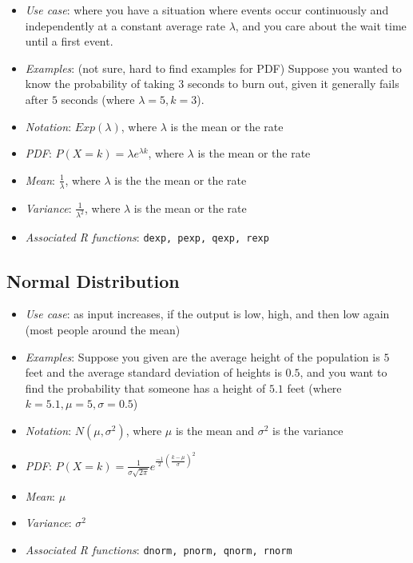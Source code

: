 \documentclass[12pt]{article}
\begin{document}
\begin{itemize}
	\item \textit{Use case}: where you have a situation where events occur
	      continuously and independently at a constant average rate $\lambda$,
	      and you care about the wait time until a first event.
	\item \textit{Examples}: (not sure, hard to find examples for PDF) Suppose
	      you wanted to know the probability of taking $3$ seconds to burn out,
	      given it generally fails after $5$ seconds (where $\lambda = 5, k =
		      3$).
	\item \textit{Notation}: $Exp(\lambda)$, where $\lambda$ is the mean or the rate
	\item \textit{PDF}: $P(X = k) = \lambda e^{\lambda k}$, where $\lambda$ is the mean or the rate
	\item \textit{Mean}: $\frac{1}{\lambda}$, where $\lambda$ is the the mean or the rate
	\item \textit{Variance}: $\frac{1}{\lambda^2}$, where $\lambda$ is the mean or the rate
	\item \textit{Associated R functions}: \verb|dexp, pexp, qexp, rexp|
\end{itemize}


\subsection*{Normal Distribution}

\begin{itemize}
	\item \textit{Use case}: as input increases, if the output is low, high,
	      and then low again (most people around the mean)
	\item \textit{Examples}: Suppose you given are the average height of the population is $5$ feet and
	      the average standard deviation of heights is $0.5$, and you
	      want to find the probability that someone has a height of $5.1$ feet
	      (where $k = 5.1, \mu = 5, \sigma = 0.5$)
	\item \textit{Notation}: $N(\mu, \sigma^2)$, where $\mu$ is the mean and
	      $\sigma^2$ is the variance
	\item \textit{PDF}: $P(X = k) = \frac{1}{\sigma \sqrt{2\pi}}  e^{\frac{-1}{2}(\frac{k-\mu}{\sigma})^2}$
	\item \textit{Mean}: $\mu$
	\item \textit{Variance}: $\sigma^2$
	\item \textit{Associated R functions}: \verb|dnorm, pnorm, qnorm, rnorm|
\end{itemize}
\end{document}
